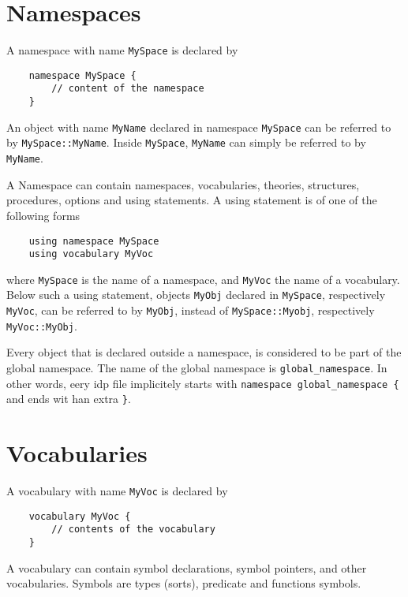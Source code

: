 \documentclass[a4]{article}
\newcommand{\idp}{{\sc idp}\xspace}
\newcommand{\code}[1]{{\tt #1}}
\begin{document}
\section{Namespaces}

A namespace with name \code{MySpace} is declared by
\begin{lstlisting}
	namespace MySpace {
		// content of the namespace
	}
\end{lstlisting}

An object with name \code{MyName} declared in namespace \code{MySpace} can be referred to by \code{MySpace::MyName}.  Inside \code{MySpace}, \code{MyName} can simply be referred to by \code{MyName}.

A Namespace can contain namespaces, vocabularies, theories, structures, procedures, options and using statements.  A using statement is of one of the following forms
\begin{lstlisting}
	using namespace MySpace
	using vocabulary MyVoc
\end{lstlisting}
where \code{MySpace} is the name of a namespace, and \code{MyVoc} the name of a vocabulary.  Below such a using statement, objects \code{MyObj} declared in \code{MySpace}, respectively \code{MyVoc}, can be referred to by \code{MyObj}, instead of \code{MySpace::Myobj}, respectively \code{MyVoc::MyObj}.

Every object that is declared outside a namespace, is considered to be part of the global namespace.  The name of the global namespace is \code{global\_namespace}.  In other words, eery \idp file implicitely starts with \code{namespace global\_namespace \{} and ends wit han extra \code{\}}.


\section{Vocabularies}

A vocabulary with name {\tt MyVoc} is declared by
\begin{lstlisting}
	vocabulary MyVoc {
		// contents of the vocabulary
	}
\end{lstlisting}
A vocabulary can contain symbol declarations, symbol pointers, and other vocabularies. Symbols are types (sorts), predicate and functions symbols.
\end{document}
